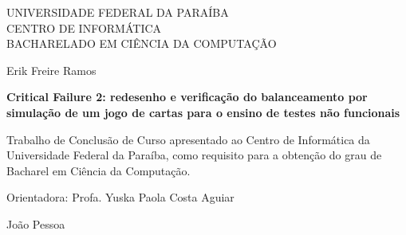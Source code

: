 \begin{titlepage}
  \centering
  {\large UNIVERSIDADE FEDERAL DA PARAÍBA\\ CENTRO DE INFORMÁTICA\\
   BACHARELADO EM CIÊNCIA DA COMPUTAÇÃO\par}
  \vspace{4cm}
  {\large Erik Freire Ramos\par}
  \vspace{2cm}
  {\Large\bfseries Critical Failure 2: redesenho e verificação do balanceamento por simulação de um jogo de
  cartas para o ensino de testes não funcionais\par}
  \vspace{3cm}
  {\normalsize Trabalho de Conclusão de Curso apresentado ao Centro de Informática da Universidade Federal da
  Paraíba, como requisito para a obtenção do grau de Bacharel em Ciência da Computação.\par}
  \vspace{1cm}
  {\normalsize Orientadora: Profa. Yuska Paola Costa Aguiar\par}
  \vfill
  {\normalsize João Pessoa\\ \par}
  \vspace{1cm}
\end{titlepage}
